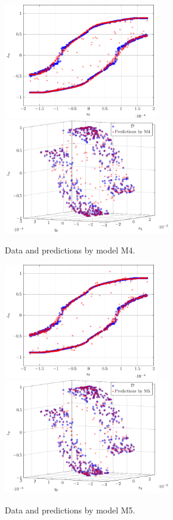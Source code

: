 \begin{figure}[H]
	\centering 
	\includegraphics[height=5cm]{graphics/pgfplots/cha6/M4_2d.pdf}\quad
	\includegraphics[height=5cm]{graphics/pgfplots/cha6/M4_3d.pdf}
	\caption{Data and predictions by model M4.}
	\label{fig:bosch-M4}
\end{figure}

\begin{figure}[H]
	\centering 
	\includegraphics[height=5cm]{graphics/pgfplots/cha6/M5_2d.pdf}\quad
	\includegraphics[height=5cm]{graphics/pgfplots/cha6/M5_3d.pdf}
	\caption{Data and predictions by model M5.}
	\label{fig:bosch-M5}
\end{figure}


